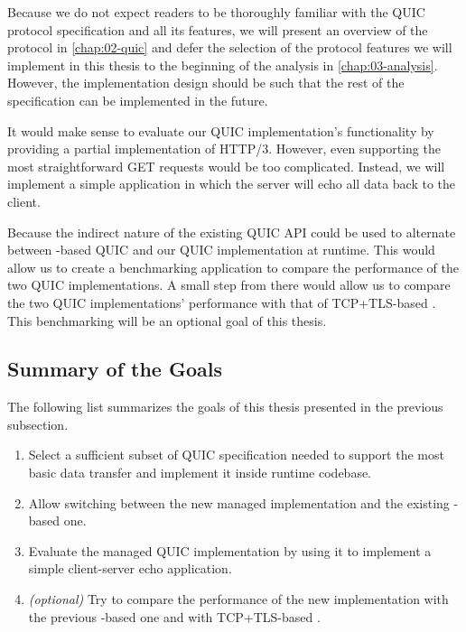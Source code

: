 Because we do not expect readers to be thoroughly familiar with the QUIC protocol specification and
all its features, we will present an overview of the protocol in \autoref{chap:02-quic} and defer
the selection of the protocol features we will implement in this thesis to the beginning of the
analysis in \autoref{chap:03-analysis}. However, the implementation design should be such that the
rest of the specification can be implemented in the future.

It would make sense to evaluate our QUIC implementation's functionality by providing a partial
implementation of HTTP/3. However, even supporting the most straightforward GET requests would be
too complicated. Instead, we will implement a simple application in which the server will echo all
data back to the client.

Because the indirect nature of the existing QUIC API could be used to alternate between
\libmsquic{}-based QUIC and our QUIC implementation at runtime. This would allow us to create a
benchmarking application to compare the performance of the two QUIC implementations. A small step
from there would allow us to compare the two QUIC implementations' performance with that of
TCP+TLS-based . This benchmarking will be an optional goal of this thesis.

\subsection*{Summary of the Goals}

The following list summarizes the goals of this thesis presented in the previous subsection.

\begin{enumerate}

  \item Select a sufficient subset of QUIC specification needed to support the most basic data
transfer and implement it inside \dotnet{} runtime codebase.

  \item Allow switching between the new managed implementation and the existing \libmsquic{}-based
one.

  \item Evaluate the managed QUIC implementation by using it to implement a simple client-server
echo application.

  \item \textit{(optional)} Try to compare the performance of the new implementation with the
previous \libmsquic{}-based one and with TCP+TLS-based .

\end{enumerate}
